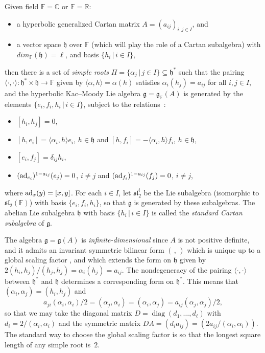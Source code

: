 \documentclass[pdftex]{sigma}
\numberwithin{equation}{section}
\def\C{{\mathbb C}}
\def\F{{\mathbb F}}
\def\R{\mathbb{R}}
\def\g{\mathfrak{g}}
\def\h{\mathfrak{h}}
\def\fsl{\mathfrak{sl}}
\begin{document}
Given field $\F = \C$ or $\F = \R$:
\begin{itemize}\itemsep=0pt
 \item[--] a hyperbolic generalized Cartan matrix $A=(a_{ij})_{i,j\in I}$, and
 \item[--] a vector space $\h$ over $\F$ (which will play the role of a Cartan subalgebra) with $dim_\F(\h)=\ell$, and basis $\{h_i\, |\, i\in I\}$,
\end{itemize}
then there is a set of {\it simple roots} $\Pi=\{\alpha_j \, |\, j\in I\}\subseteq \h^*$ such that the pairing $\langle\cdot,\cdot\rangle\colon \h^*\times \h\to\F$ given by $\langle\alpha,h\rangle = \alpha(h)$ satisfies $\alpha_i(h_j) = a_{ij}$ for all $i,j\in I$, and
the hyperbolic Kac--Moody Lie algebra $\g=\g_\F(A)$ is generated by the elements $\{e_i, f_i, h_i\, |\, i\in I\}$, subject to the relations~\cite{GabberKac81, Kac90}:
\begin{itemize}\itemsep=0pt
 \item[--] $[h_i, h_j]=0$,
 \item[--] $[h,e_i]=\langle\alpha_i,h\rangle e_i$, $h\in \h$ and $[h,f_i]=-\langle\alpha_i,h\rangle f_i$, $h\in \h$,
 \item[--] $[e_i,f_j]=\delta_{ij}h_i$,
 \item[--] $({\rm ad}_{e_i})^{1-a_{ij}}(e_j)=0$, $i\neq j$ and $({\rm ad}_{f_i})^{1-a_{ij}}(f_j)=0$, $i\neq j$,
\end{itemize}

\noindent where ${\rm ad}_x(y)=[x,y]$. For each $i\in I$, let $\fsl_2^i$ be the Lie subalgebra (isomorphic to $\fsl_2(\F)$) with basis $\{e_i, f_i,h_i\}$, so that $\g$ is generated by these subalgebras. The abelian Lie subalgebra $\h$ with basis $\{h_i\, |\, i\in I\}$ is called the {\it standard Cartan subalgebra} of $\g$.

The algebra $\g=\g(A)$ is {\it infinite-dimensional} since $A$ is not positive definite, and it
admits an invariant symmetric bilinear form $(\hspace{2pt},\hspace{2pt})$ which is unique up to a global scaling factor
\cite[Section~II]{Kac90}, and which extends the form on $\h$ given by $2(h_i,h_j)/(h_j,h_j) = \alpha_i(h_j) = a_{ij}$. The nondegeneracy
of the pairing $\langle\cdot,\cdot\rangle$ between $\h^*$ and $\h$ determines a corresponding form on $\h^*$. This means that
$(\alpha_i,\alpha_j) = (h_i,h_j)$ and
\[a_{ji} (\alpha_i,\alpha_i)/2 = (\alpha_j,\alpha_i) = (\alpha_i,\alpha_j) = a_{ij} (\alpha_j,\alpha_j)/2, \]
so that we may take the diagonal matrix $D = \operatorname{diag}(d_1,\dots,d_\ell)$ with $d_i = 2/(\alpha_i,\alpha_i)$ and the symmetric matrix
$DA = (d_i a_{ij}) = (2 a_{ij}/(\alpha_i,\alpha_i))$. The standard way to choose
the global scaling factor is so that the longest square length of any simple root is~$2$.
\end{document}
